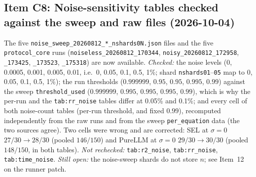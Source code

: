 \documentclass[11pt]{article}
\begin{document}
\subsection*{Item C8: Noise-sensitivity tables checked against the sweep and raw files (2026-10-04)}
The five \texttt{noise\_sweep\_20260812\_*\_nshards0N.json} files and the five \texttt{protocol\_core} runs
(\texttt{noiseless\_20260812\_170344}, \texttt{noisy\_20260812\_172958}, \texttt{\_173425}, \texttt{\_173523}, \texttt{\_175318}) are now
available. \emph{Checked:} the noise levels (0, 0.0005, 0.001, 0.005, 0.01, i.e.\ 0, 0.05, 0.1, 0.5, 1\%; shard
\texttt{nshards01}--\texttt{05} map to 0, 0.05, 0.1, 0.5, 1\%); the run thresholds ($0.999999$, $0.95$, $0.95$, $0.995$, $0.99$) against the sweep
\texttt{threshold\_used} ($0.999999$, $0.995$, $0.995$, $0.995$, $0.99$), which is why the per-run and the \texttt{tab:rr\_noise}
tables differ at 0.05\% and 0.1\%; and every cell of both noise-count tables (per-run threshold, and fixed $0.99$), recomputed
independently from the raw runs and from the sweep \texttt{per\_equation} data (the two sources agree). Two cells were wrong and are corrected: SEL at
$\sigma=0$ $27/30\to28/30$ (pooled $146/150$) and PureLLM at $\sigma=0$ $29/30\to30/30$ (pooled $148/150$, in both tables).
\emph{Not rechecked:} \texttt{tab:r2\_noise}, \texttt{tab:rr\_noise}, \texttt{tab:time\_noise}. \emph{Still open:} the noise-sweep
shards do not store $n$; see Item~12 on the runner patch.
\end{document}
